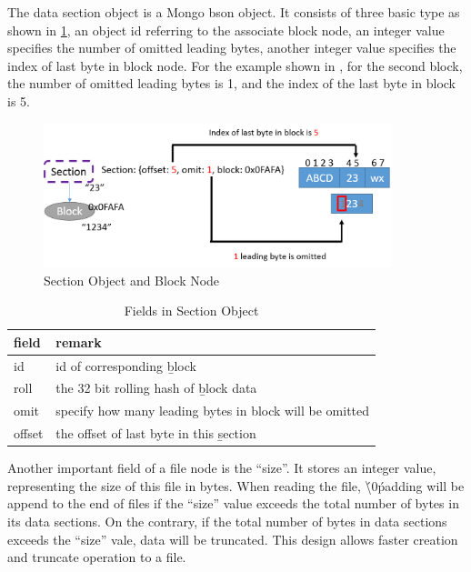     The data section object is a Mongo bson object. It consists of three basic type as shown in \ref{tab:section_fields}, an object id referring to the associate block node, an integer value specifies the number of omitted leading bytes, another integer value specifies the index of last byte in block node. For the example shown in , for the second block, the number of omitted leading bytes is 1, and the index of the last byte in block is 5.

\begin{figure}[hbtp]
\centering
\includegraphics[width=0.9\textwidth]{Chapter-3/figs/fig9.png}
\caption{Section Object and Block Node}
\label{fig:section_and_block}
\end{figure}

\begin{table}
\caption{Fields in Section Object}
\label{tab:section_fields}
\begin{center}
\begin{tabular}{ll}
\toprule
field & remark\\
\midrule
id & id of corresponding \b{block}\\
roll & the 32 bit rolling hash of \b{block} data\\
omit & specify how many leading bytes in block will be omitted\\
offset & the offset of last byte in this \b{section}\\
\bottomrule
\end{tabular}
\end{center}
\end{table}

    Another important field of a file node is the “size”. It stores an integer value, representing the size of this file in bytes. When reading the file, \'\textbackslash0\' padding will be append to the end of files if the “size” value exceeds the total number of bytes in its data sections. On the contrary, if the total number of bytes in data sections exceeds the “size” vale, data will be truncated. This design allows faster creation and truncate operation to a file.

